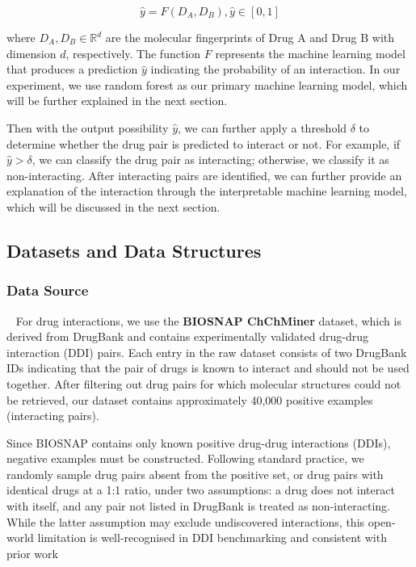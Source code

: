 \documentclass[letterpaper]{article} %
\begin{document}
\begin{equation}
    \hat{y} = F(D_A, D_B), \hat{y} \in [0, 1]
\end{equation}

where $D_A, D_B \in \mathbb{R}^{d}$ are the molecular fingerprints of Drug A and Drug B with dimension $d$, respectively. The function $F$ represents the machine learning model that produces a prediction $\hat{y}$ indicating the probability of an interaction. In our experiment, we use random forest as our primary machine learning model, which will be further explained in the next section.

Then with the output possibility $\hat{y}$, we can further apply a threshold $\delta$ to determine whether the drug pair is predicted to interact or not. For example, if $\hat{y} > \delta$, we can classify the drug pair as interacting; otherwise, we classify it as non-interacting. After interacting pairs are identified, we can further provide an explanation of the interaction through the interpretable machine learning model, which will be discussed in the next section.


\subsection{Datasets and Data Structures}

\subsubsection{Data Source}
\ 
\newline
For drug interactions, we use the \textbf{BIOSNAP ChChMiner} dataset, which is derived from DrugBank and contains experimentally validated drug-drug interaction (DDI) pairs. Each entry in the raw dataset consists of two DrugBank IDs indicating that the pair of drugs is known to interact and should not be used together. After filtering out drug pairs for which molecular structures could not be retrieved, our dataset contains approximately 40,000 positive examples (interacting pairs). 

Since BIOSNAP contains only known positive drug-drug interactions (DDIs), negative examples must be constructed. Following standard practice, we randomly sample drug pairs absent from the positive set, or drug pairs with identical drugs at a 1:1 ratio, under two assumptions: a drug does not interact with itself, and any pair not listed in DrugBank is treated as non-interacting. While the latter assumption may exclude undiscovered interactions, this open-world limitation is well-recognised in DDI benchmarking and consistent with prior work
\end{document}
